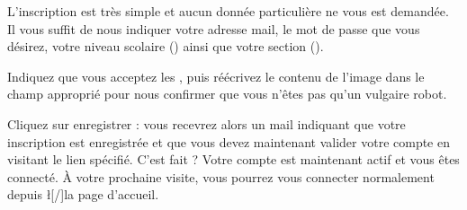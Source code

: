 ﻿L'inscription est très simple et aucun donnée particulière ne vous est demandée. Il vous suffit de nous indiquer votre adresse mail, le mot de passe que vous désirez, votre niveau scolaire () ainsi que votre section ().

Indiquez que vous acceptez les , puis réécrivez le contenu de l'image dans le champ approprié pour nous confirmer que vous n'êtes pas qu'un vulgaire robot.

Cliquez sur enregistrer : vous recevrez alors un mail indiquant que votre inscription est enregistrée et que vous devez maintenant valider votre compte en visitant le lien spécifié.
C'est fait ? Votre compte est maintenant actif et vous êtes connecté. À votre prochaine visite, vous pourrez vous connecter normalement depuis \l[/]{la page d'accueil}.